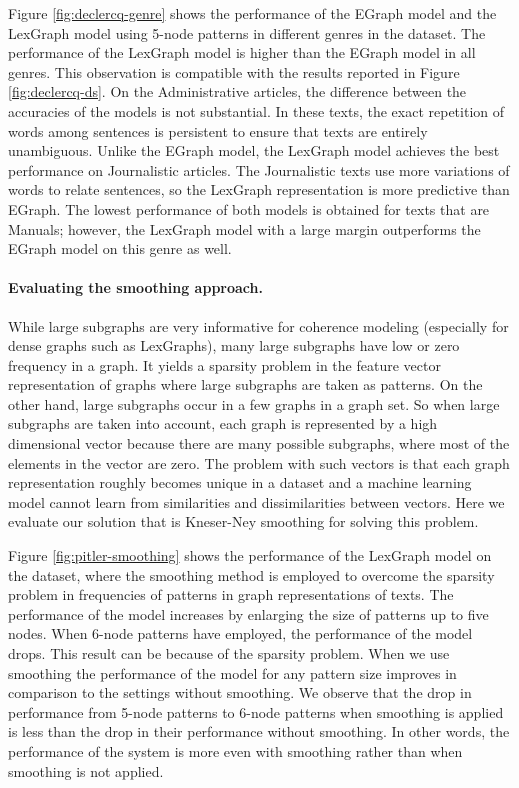 Figure \ref{fig:declercq-genre} shows the performance of the EGraph model and the LexGraph model using 5-node patterns in different genres in the \declercqds dataset. 
The performance of the LexGraph model is higher than the EGraph model in all genres. 
This observation is compatible with the results reported in Figure \ref{fig:declercq-ds}. 
On the Administrative articles, the difference between the accuracies of the models is not substantial.  
In these texts, the exact repetition of words among sentences is persistent to ensure that texts are entirely unambiguous. 
Unlike the EGraph model, the LexGraph model achieves the best performance on Journalistic articles. 
The Journalistic texts use more variations of words to relate sentences, so the LexGraph representation is more predictive than EGraph. 
The lowest performance of both models is obtained for texts that are Manuals; however, the LexGraph model with a large margin outperforms the EGraph model on this genre as well. 

\paragraph{Evaluating the smoothing approach.}
While large subgraphs are very informative for coherence modeling (especially for dense graphs such as LexGraphs), many large subgraphs have low or zero frequency in a graph.
It yields a sparsity problem in the feature vector representation of graphs where large subgraphs are taken as patterns. 
On the other hand, large subgraphs occur in a few graphs in a graph set. 
So when large subgraphs are taken into account, each graph is represented by a high dimensional vector because there are many possible subgraphs, where most of the elements in the vector are zero.   
The problem with such vectors is that each graph representation roughly becomes unique in a dataset and a machine learning model cannot learn from similarities and dissimilarities between vectors. 
Here we evaluate our solution that is \mbox{Kneser-Ney} smoothing for solving this problem. 

Figure \ref{fig:pitler-smoothing} shows the performance of the LexGraph model on the \pitlerds dataset, where the smoothing method is employed to overcome the sparsity problem in frequencies of patterns in graph representations of texts. 
The performance of the model increases by enlarging the size of patterns up to five nodes. 
When 6-node patterns have employed, the performance of the model drops. 
This result can be because of the sparsity problem. 
When we use smoothing the performance of the model for any pattern size improves in comparison to the settings without smoothing.  
We observe that the drop in performance from 5-node patterns to 6-node patterns when smoothing is applied is less than the drop in their performance without smoothing.
In other words, the performance of the system is more even with smoothing rather than when smoothing is not applied. 

